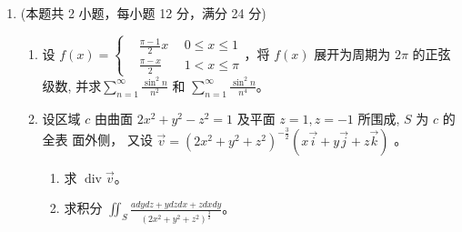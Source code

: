 \begin{enumerate}
\begin{enumerate}
	
	
	
\end{enumerate}





\newpage
\item 
(本题共 2 小题，每小题 12 分，满分 24 分)
\begin{enumerate}
	\item
	设 $f(x)=\left\{\begin{aligned}&\frac{\pi-1}{2} x \ & \ 0 \leqslant x \leqslant 1 \\ &\frac{\pi-x}{2} \ & \ 1<x \leqslant \pi\end{aligned}\right.$，将 $f(x)$ 展开为周期为 $2 \pi$ 的正弦级数, 并求$\sum\limits_{n=1}^{\infty} \frac{\sin ^{2} n}{n^{2}}$ 和 $\sum\limits_{n=1}^{\infty} \frac{\sin ^{2} n}{n^{4}}$。
	
	\item 
设区域 $c$ 由曲面 $2 x^{2}+y^{2}-z^{2}=1$ 及平面 $z=1, z=-1$ 所围成, $S$ 为 $c$ 的全表 面外侧， 又设 $\vec{v}=\left(2 x^{2}+y^{2}+z^{2}\right)^{-\frac{3}{2}}(x \vec{i}+y \vec{j}+z \vec{k})$ 。
\begin{enumerate}
	\item
求 $\operatorname{div} \vec{v}$。
	\item 
	求积分 $\iint_{S} \frac{a d y d z+y d z d x+z d x d y}{\left(2 x^{2}+y^{2}+z^{2}\right)^{\frac{3}{2}}}$。
\end{enumerate}
	

\end{enumerate}
\end{enumerate}
